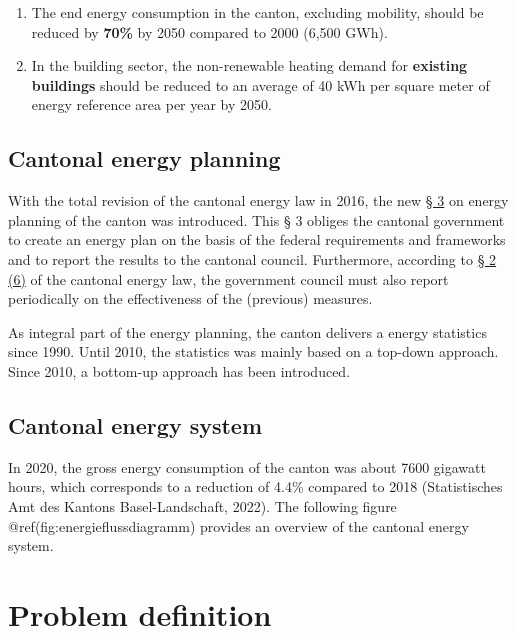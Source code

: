 \documentclass[
  letterpaper,
  DIV=11,
  numbers=noendperiod]{scrreprt}
\providecommand{\tightlist}{%
  \setlength{\itemsep}{0pt}\setlength{\parskip}{0pt}}\usepackage{longtable,booktabs,array}
\begin{document}
\begin{enumerate}
\def\labelenumi{\arabic{enumi}.}
\tightlist
\item
  The end energy consumption in the canton, excluding mobility, should
  be reduced by \textbf{70\%} by 2050 compared to 2000 (6,500 GWh).
\item
  In the building sector, the non-renewable heating demand for
  \textbf{existing buildings} should be reduced to an average of 40 kWh
  per square meter of energy reference area per year by 2050.
\end{enumerate}

\hypertarget{cantonal-energy-planning-1}{%
\subsection{Cantonal energy planning}\label{cantonal-energy-planning-1}}

With the total revision of the cantonal energy law in 2016, the new
\href{https://bl.clex.ch/app/de/texts_of_law/490/art/3}{§ 3} on energy
planning of the canton was introduced. This § 3 obliges the cantonal
government to create an energy plan on the basis of the federal
requirements and frameworks and to report the results to the cantonal
council. Furthermore, according to
\href{https://bl.clex.ch/app/de/texts_of_law/490/art/2}{§ 2 (6)} of the
cantonal energy law, the government council must also report
periodically on the effectiveness of the (previous) measures.

As integral part of the energy planning, the canton delivers a energy
statistics since 1990. Until 2010, the statistics was mainly based on a
top-down approach. Since 2010, a bottom-up approach has been introduced.

\hypertarget{cantonal-energy-system}{%
\subsection{Cantonal energy system}\label{cantonal-energy-system}}

In 2020, the gross energy consumption of the canton was about 7600
gigawatt hours, which corresponds to a reduction of 4.4\% compared to
2018 (Statistisches Amt des Kantons Basel-Landschaft, 2022). The
following figure @ref(fig:energieflussdiagramm) provides an overview of
the cantonal energy system.

\hypertarget{sec-problem-definition}{%
\section{Problem definition}\label{sec-problem-definition}}
\end{document}
